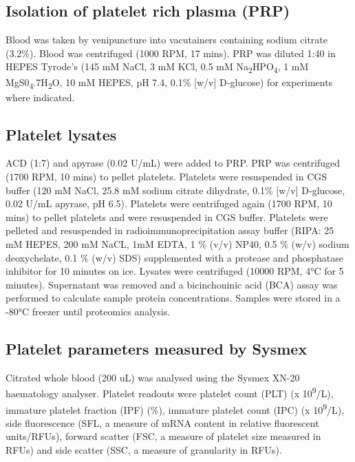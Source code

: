 \documentclass[11pt,twoside]{bristolthesis}
\begin{document}
\hypertarget{isolation-of-platelet-rich-plasma-prp}{%
\subsection{Isolation of platelet rich plasma (PRP)}\label{isolation-of-platelet-rich-plasma-prp}}

Blood was taken by venipuncture into vacutainers containing sodium citrate (3.2\%). Blood was centrifuged (1000 RPM, 17 mins). PRP was diluted 1:40 in HEPES Tyrode's (145 mM NaCl, 3 mM KCl, 0.5 mM Na\textsubscript{2}HPO\textsubscript{4}, 1 mM MgS0\textsubscript{4}.7H\textsubscript{2}O, 10 mM HEPES, pH 7.4, 0.1\% {[}w/v{]} D‐glucose) for experiments where indicated.

\hypertarget{platelet-lysates}{%
\subsection{Platelet lysates}\label{platelet-lysates}}

ACD (1:7) and apyrase (0.02 U/mL) were added to PRP. PRP was centrifuged (1700 RPM, 10 mins) to pellet platelets. Platelets were resuspended in CGS buffer (120 mM NaCl, 25.8 mM sodium citrate dihydrate, 0.1\% {[}w/v{]} D‐glucose, 0.02 U/mL apyrase, pH 6.5). Platelets were centrifuged again (1700 RPM, 10 mins) to pellet platelets and were resuspended in CGS buffer. Platelets were pelleted and resuspended in radioimmunoprecipitation assay buffer (RIPA: 25 mM HEPES, 200 mM NaCL, 1mM EDTA, 1 \% (v/v) NP40, 0.5 \% (w/v) sodium deoxychelate, 0.1 \% (w/v) SDS) supplemented with a protease and phosphatase inhibitor for 10 minutes on ice. Lysates were centrifuged (10000 RPM, 4°C for 5 minutes). Supernatant was removed and a bicinchoninic acid (BCA) assay was performed to calculate sample protein concentrations. Samples were stored in a -80°C freezer until proteomics analysis.

\hypertarget{platelet-parameters-measured-by-sysmex}{%
\subsection{Platelet parameters measured by Sysmex}\label{platelet-parameters-measured-by-sysmex}}

Citrated whole blood (200 uL) was analysed using the Sysmex XN-20 haematology analyser. Platelet readouts were platelet count (PLT) (x 10\textsuperscript{9}/L), immature platelet fraction (IPF) (\%), immature platelet count (IPC) (x 10\textsuperscript{9}/L), side fluorescence (SFL, a measure of mRNA content in relative fluorescent units/RFUs), forward scatter (FSC, a measure of platelet size measured in RFUs) and side scatter (SSC, a measure of granularity in RFUs).
\end{document}
